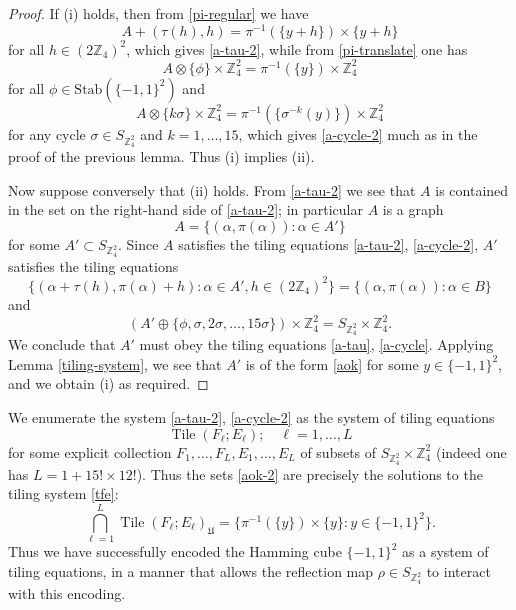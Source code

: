 \documentclass[reqno,a4paper,12pt]{amsart}
\numberwithin{equation}{section}
\numberwithin{figure}{section}
\def\Z{\mathbb{Z}}
\newcommand{\Tile}{\operatorname{Tile}}
\newcommand{\Universe}{{\mathfrak{U}}}
\theoremstyle{plain}
\theoremstyle{definition}
\begin{document}
\begin{proof}  If (i) holds, then from \eqref{pi-regular} we have
$$ A + (\tau(h),h) = \pi^{-1}(\{y+h\}) \times \{y+h\}$$
for all $h \in (2\Z_4)^2$, which gives \eqref{a-tau-2}, while from \eqref{pi-translate} one has
$$ A \otimes \{\phi\} \times \Z_4^2 = \pi^{-1}(\{y\}) \times \Z_4^2$$
for all $\phi \in \mathrm{Stab}(\{-1,1\}^2)$ and
$$ A \otimes \{k\sigma\} \times \Z_4^2 = \pi^{-1}(\{\sigma^{-k}(y)\}) \times \Z_4^2$$
for any cycle $\sigma \in S_{\Z_4^2}$ and $k=1,\dots,15$, which gives \eqref{a-cycle-2} much as in the proof of the previous lemma.  Thus (i) implies (ii).

Now suppose conversely that (ii) holds.  From \eqref{a-tau-2}  we see that $A$ is contained in the set on the right-hand side of \eqref{a-tau-2}; in particular $A$ is a graph
$$ A = \{ (\alpha,\pi(\alpha)): \alpha \in A' \}$$
for some $A' \subset S_{\Z_4^2}$.  Since $A$ satisfies the tiling equations \eqref{a-tau-2}, \eqref{a-cycle-2}, $A'$ satisfies the tiling equations 
\begin{equation*}
\{ (\alpha + \tau(h), \pi(\alpha) + h): \alpha \in A', h \in (2\Z_4)^2\} = \{ (\alpha,\pi(\alpha)): \alpha \in B \}
\end{equation*}
and 
\begin{equation*}
(A'  \oplus \{ \phi, \sigma, 2\sigma, \dots, 15 \sigma\} ) \times  \Z_4^2  = S_{\Z_4^2} \times \Z_4^2.
\end{equation*}
We conclude  that $A'$ must obey the tiling equations \eqref{a-tau}, \eqref{a-cycle}.  Applying Lemma \ref{tiling-system}, we see that $A'$ is of the form \eqref{aok} for some $y \in \{-1,1\}^2$, and we obtain (i) as required.
\end{proof}

We enumerate the system \eqref{a-tau-2}, \eqref{a-cycle-2} as the system of tiling equations
\begin{equation}\label{tfe}
\Tile( F_\ell; E_\ell ); \quad \ell=1,\dots, L
\end{equation}
for some explicit collection $F_1,\dots,F_L, E_1,\dots,E_L$ of subsets of $S_{\Z_4^2} \times \Z_4^2$ (indeed one has $L = 1 + 15! \times 12!$).  Thus the sets \eqref{aok-2} are precisely the solutions to the tiling system \eqref{tfe}:
\begin{equation}\label{tfe-encode}
 \bigcap_{\ell=1}^L \Tile( F_\ell; E_\ell )_\Universe = \{ \pi^{-1}(\{y\}) \times \{y\}: y \in \{-1,1\}^2 \}.
 \end{equation}
Thus we have successfully encoded the Hamming cube $\{-1,1\}^2$ as a system of tiling equations, in a manner that allows the reflection map $\rho \in S_{\Z_4^2}$ to interact with this encoding.
\end{document}
